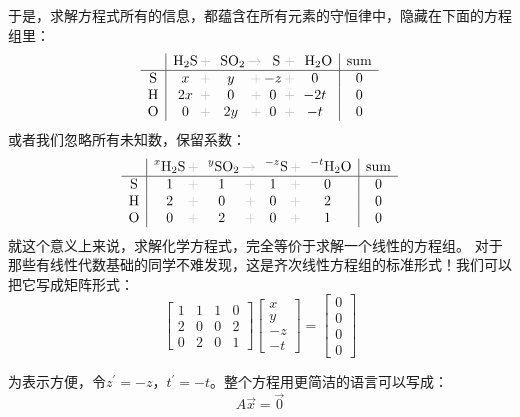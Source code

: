 \documentclass{ctexart}
\newcommand{\grayplus}{\,\color{lightgray}+\,}
\newcommand{\grayto}{\,\color{lightgray}\to\,}
\begin{document}
于是，求解方程式所有的信息，都蕴含在所有元素的守恒律中，隐藏在下面的方程组里：
\[
    \begin{array}{c|*{3}{c@{\grayplus}}c|c}
        & \multicolumn{1}{c@{\grayplus}}{\ce{H2S}} &
        \multicolumn{1}{c@{\grayto}}{\ce{SO2}} &
        \multicolumn{1}{c@{\grayplus}}{\ce{S}} &
        \multicolumn{1}{c|}{\ce{H2O}} & \text{sum} \\
        \hline
        \ce{S} & x & y & -z & 0 & 0 \\
        \ce{H} & 2x & 0 & 0 & -2t & 0 \\
        \ce{O} & 0 & 2y & 0 & -t & 0 \\
    \end{array}
\]
或者我们忽略所有未知数，保留系数：
\[
    \begin{array}{c|*{3}{c@{\grayplus}}c|c}
        & \multicolumn{1}{c@{\grayplus}}{\prescript{x}{}{\ce{H2S}}} &
        \multicolumn{1}{c@{\grayto}}{\prescript{y}{}{\ce{SO2}}} &
        \multicolumn{1}{c@{\grayplus}}{\prescript{-z}{}{\ce{S}}} &
        \multicolumn{1}{c|}{\prescript{-t}{}{\ce{H2O}}} & \text{sum} \\
        \hline
        \ce{S} & 1 & 1 & 1 & 0 & 0 \\
        \ce{H} & 2 & 0 & 0 & 2 & 0 \\
        \ce{O} & 0 & 2 & 0 & 1 & 0 \\
    \end{array}
\]
就这个意义上来说，求解化学方程式，完全等价于求解一个线性的方程组。
对于那些有线性代数基础的同学不难发现，这是齐次线性方程组的标准形式！我们可以把它写成矩阵形式：
\[
    \begin{bmatrix}
        1 & 1 & 1 & 0 \\
        2 & 0 & 0 & 2 \\
        0 & 2 & 0 & 1
    \end{bmatrix}
    \begin{bmatrix}
        x \\ y \\ -z \\ -t
    \end{bmatrix}
    =
    \begin{bmatrix}
        0 \\ 0 \\ 0 \\ 0
    \end{bmatrix}
\]

为表示方便，令\( z^\prime = -z \)，\( t^\prime = -t \)。整个方程用更简洁的语言可以写成：
\[
    A \vec{x} = \vec{0}
\]
\end{document}
